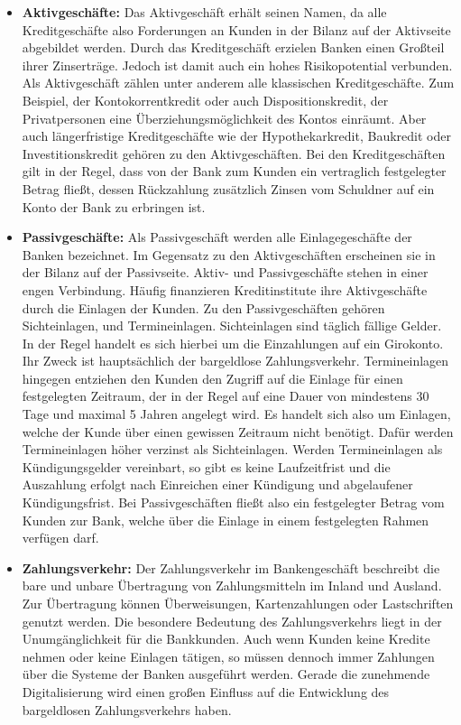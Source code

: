 \documentclass[12pt,oneside,a4paper,parskip]{scrbook}
\begin{document}
\begin{itemize}
  \item \textbf{Aktivgeschäfte:} Das Aktivgeschäft erhält seinen Namen, da alle Kreditgeschäfte also Forderungen an Kunden in der Bilanz auf der Aktivseite abgebildet werden. Durch das Kreditgeschäft erzielen Banken einen Großteil ihrer Zinserträge. Jedoch ist damit auch ein hohes Risikopotential verbunden. Als Aktivgeschäft zählen unter anderem alle klassischen Kreditgeschäfte.
  Zum Beispiel, der Kontokorrentkredit oder auch Dispositionskredit, der Privatpersonen eine Überziehungsmöglichkeit des Kontos einräumt. Aber auch längerfristige Kreditgeschäfte wie der Hypothekarkredit, Baukredit oder Investitionskredit gehören zu den Aktivgeschäften. Bei den Kreditgeschäften gilt in der Regel, dass von der Bank zum Kunden ein vertraglich festgelegter Betrag fließt, dessen Rückzahlung zusätzlich Zinsen vom Schuldner auf ein Konto der Bank zu erbringen ist.
  \item \textbf{Passivgeschäfte:} Als Passivgeschäft werden alle Einlagegeschäfte der Banken bezeichnet. Im Gegensatz zu den Aktivgeschäften erscheinen sie in der Bilanz auf der Passivseite. Aktiv- und Passivgeschäfte stehen in einer engen Verbindung. Häufig finanzieren Kreditinstitute ihre Aktivgeschäfte durch die Einlagen der Kunden. Zu den Passivgeschäften gehören Sichteinlagen, und Termineinlagen. Sichteinlagen sind täglich fällige Gelder. In der Regel handelt es sich hierbei um die Einzahlungen auf ein Girokonto. Ihr Zweck ist hauptsächlich der bargeldlose Zahlungsverkehr. Termineinlagen hingegen entziehen den Kunden den Zugriff auf die Einlage für einen festgelegten Zeitraum, der in der Regel auf eine Dauer von mindestens 30 Tage und maximal 5 Jahren angelegt wird. Es handelt sich also um Einlagen, welche der Kunde über einen gewissen Zeitraum nicht benötigt. Dafür werden Termineinlagen höher verzinst als Sichteinlagen. Werden Termineinlagen als Kündigungsgelder vereinbart, so gibt es keine Laufzeitfrist und die Auszahlung erfolgt nach Einreichen einer Kündigung und abgelaufener Kündigungsfrist. Bei Passivgeschäften fließt also ein festgelegter Betrag vom Kunden zur Bank, welche über die Einlage in einem festgelegten Rahmen verfügen darf.
  \item \textbf{Zahlungsverkehr:} Der Zahlungsverkehr im Bankengeschäft beschreibt die bare und unbare Übertragung von Zahlungsmitteln im Inland und Ausland. Zur Übertragung können Überweisungen, Kartenzahlungen oder Lastschriften genutzt werden. Die besondere Bedeutung des Zahlungsverkehrs liegt in der Unumgänglichkeit für die Bankkunden. Auch wenn Kunden keine Kredite nehmen oder keine Einlagen tätigen, so müssen dennoch immer Zahlungen über die Systeme der Banken ausgeführt werden. Gerade die zunehmende Digitalisierung wird einen großen Einfluss auf die Entwicklung des bargeldlosen Zahlungsverkehrs haben. 
\end{itemize}
\end{document}
